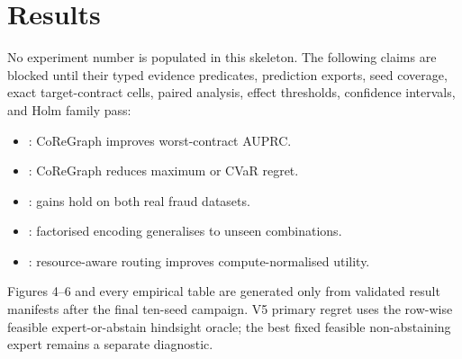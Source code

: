 \section{Results}

\tablepending

No experiment number is populated in this skeleton. The following claims are
blocked until their typed evidence predicates, prediction exports, seed
coverage, exact target-contract cells, paired analysis, effect thresholds,
confidence intervals, and Holm family pass:

\begin{itemize}
  \item \claimblocked: CoReGraph improves worst-contract AUPRC.
  \item \claimblocked: CoReGraph reduces maximum or CVaR regret.
  \item \claimblocked: gains hold on both real fraud datasets.
  \item \claimblocked: factorised encoding generalises to unseen combinations.
  \item \claimblocked: resource-aware routing improves compute-normalised utility.
\end{itemize}

Figures 4--6 and every empirical table are generated only from validated result
manifests after the final ten-seed campaign. V5 primary regret uses the
row-wise feasible expert-or-abstain hindsight oracle; the best fixed feasible
non-abstaining expert remains a separate diagnostic.
